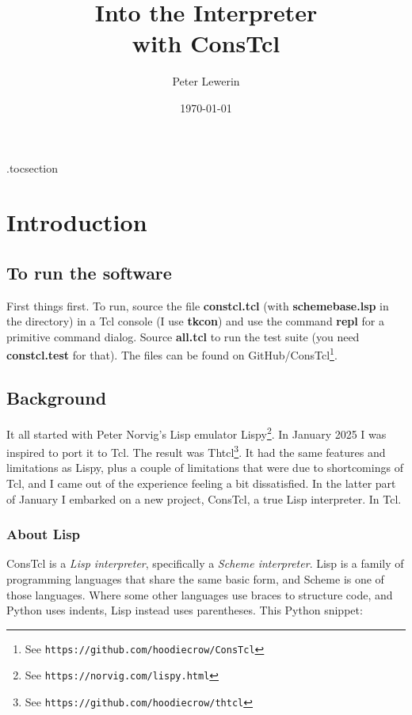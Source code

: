\documentclass[twoside,9pt]{report}
\title{Into the Interpreter\\with ConsTcl}
\author{Peter Lewerin}
\date{\today}
\begin{document}
\pagestyle{headings}
\maketitle

\renewcommand*{\contentsname}{Short contents}
\etocsettocdepth.toc{section}
\tableofcontents

\renewcommand*\contentsname{Detailed contents}
\etocignoretoctocdepth
\tableofcontents


\chapter{Introduction}
\label{introduction}
\section{To run the software}
\label{to-run-the-software}


First things first. To run, source the file \textbf{constcl.tcl} (with
\textbf{schemebase.lsp} in the directory) in a Tcl console (I use
\textbf{tkcon}) and use the command \textbf{repl} for a primitive command
dialog. Source \textbf{all.tcl} to run the test suite (you need
\textbf{constcl.test} for that). The files can be found on GitHub/ConsTcl\footnote{See
\texttt{https://github.com/hoodiecrow/ConsTcl}}.

\section{Background}
\label{background}

It all started with Peter Norvig's Lisp emulator
Lispy\footnote{See \texttt{https://norvig.com/lispy.html}}. In January 2025 I
was inspired to port it to Tcl. The result was Thtcl\footnote{See
\texttt{https://github.com/hoodiecrow/thtcl}}. It had the same features and
limitations as Lispy, plus a couple of limitations that were due to
shortcomings of Tcl, and I came out of the experience feeling a bit
dissatisfied. In the latter part of January I embarked on a new project,
ConsTcl, a true Lisp interpreter. In Tcl.

\subsection{About Lisp}
\label{about-lisp}

ConsTcl is a \emph{Lisp interpreter}, specifically a \emph{Scheme interpreter}.
Lisp is a family of programming languages that share the same basic form, and
Scheme is one of those languages. Where some other languages use braces to
structure code, and Python uses indents, Lisp instead uses parentheses. This
Python snippet:
\end{document}
